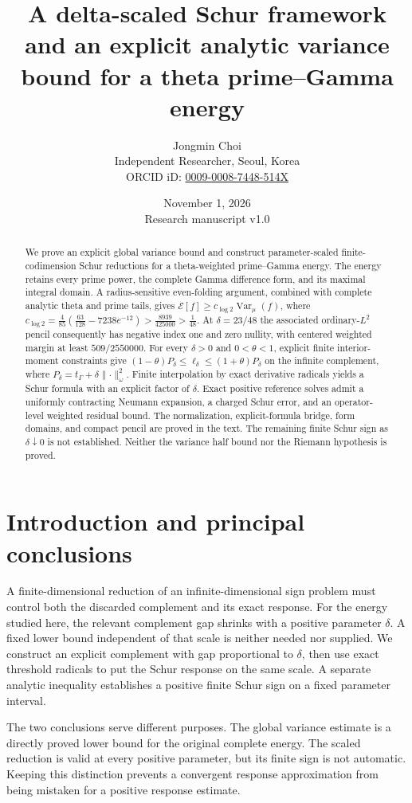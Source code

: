 \documentclass[11pt,a4paper]{article}
\title{A delta-scaled Schur framework and an explicit analytic variance bound for a theta prime--Gamma energy}
\author{Jongmin Choi\\[3pt]\small Independent Researcher, Seoul, Korea\\\small ORCID iD: \href{https://orcid.org/0009-0008-7448-514X}{0009-0008-7448-514X}}
\date{November 1, 2026\\[3pt]\small Research manuscript v1.0}
\numberwithin{equation}{section}
\theoremstyle{remark}
\newcommand{\E}{\mathcal E}
\newcommand{\tg}{t_{\Gamma}}
\newcommand{\Var}{\operatorname{Var}}
\newcommand{\norm}[1]{\lVert #1\rVert}
\begin{document}
\maketitle
\begin{abstract}
We prove an explicit global variance bound and construct parameter-scaled finite-codimension Schur reductions for a theta-weighted prime--Gamma energy. The energy retains every prime power, the complete Gamma difference form, and its maximal integral domain. A radius-sensitive even-folding argument, combined with complete analytic theta and prime tails, gives
$\E[f]\ge c_{\log 2}\Var_\mu(f)$, where
$c_{\log 2}=\frac4{85}(\frac{63}{128}-7238e^{-12})>
\frac{8939}{425000}>\frac1{48}$.
At $\delta=23/48$ the associated ordinary-$L^2$ pencil consequently has negative index one and zero nullity, with centered weighted margin at least $509/2550000$.
For every $\delta>0$ and $0<\theta<1$, explicit finite interior-moment constraints give
$(1-\theta)P_\delta\le\ell_\delta\le(1+\theta)P_\delta$ on the infinite complement, where $P_\delta=\tg+\delta\norm{\cdot}_\omega^2$.
Finite interpolation by exact derivative radicals yields a Schur formula with an explicit factor of $\delta$. Exact positive reference solves admit a uniformly contracting Neumann expansion, a charged Schur error, and an operator-level weighted residual bound.
The normalization, explicit-formula bridge, form domains, and compact pencil are proved in the text. The remaining finite Schur sign as $\delta\downarrow0$ is not established. Neither the variance half bound nor the Riemann hypothesis is proved.
\end{abstract}

\section{Introduction and principal conclusions}

A finite-dimensional reduction of an infinite-dimensional sign problem must control both the discarded complement and its exact response. For the energy studied here, the relevant complement gap shrinks with a positive parameter $\delta$. A fixed lower bound independent of that scale is neither needed nor supplied. We construct an explicit complement with gap proportional to $\delta$, then use exact threshold radicals to put the Schur response on the same scale. A separate analytic inequality establishes a positive finite Schur sign on a fixed parameter interval.

The two conclusions serve different purposes. The global variance estimate is a directly proved lower bound for the original complete energy. The scaled reduction is valid at every positive parameter, but its finite sign is not automatic. Keeping this distinction prevents a convergent response approximation from being mistaken for a positive response estimate.
\end{document}

